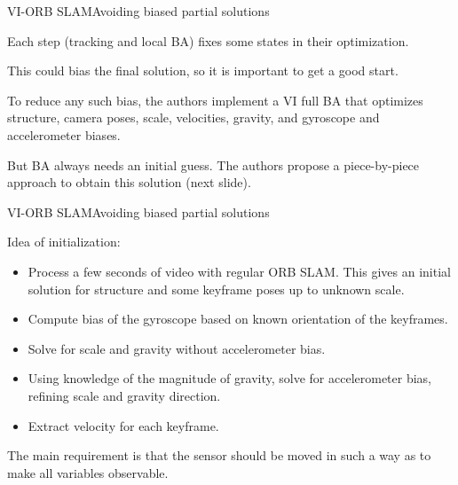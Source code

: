 \documentclass[aspectratio=169]{beamer}
\begin{document}
\begin{frame}{VI-ORB SLAM}{Avoiding biased partial solutions}

Each step (tracking and local BA) fixes some states in their optimization.

\medskip

This could bias the final solution, so it is important to get a good
start.

\medskip

To reduce any such bias, the authors implement a VI full BA that optimizes
structure, camera poses, scale, velocities, gravity, and gyroscope and
accelerometer biases.

\medskip

But BA always needs an initial guess. The authors propose a
piece-by-piece approach to obtain this solution (next slide).

\end{frame}


\begin{frame}{VI-ORB SLAM}{Avoiding biased partial solutions}

Idea of initialization:
\begin{itemize}
\item Process a few seconds of video with regular ORB SLAM. This gives an
initial solution for structure and some keyframe poses up to unknown scale.
\item Compute bias of the gyroscope based on known orientation of the keyframes.
\item Solve for scale and gravity without accelerometer bias.
\item Using knowledge of the magnitude of gravity, solve for accelerometer
bias, refining scale and gravity direction.
\item Extract velocity for each keyframe.
\end{itemize}

\medskip

The main requirement is that the sensor should be moved in such a way as
to make all variables observable.

\end{frame}
\end{document}
